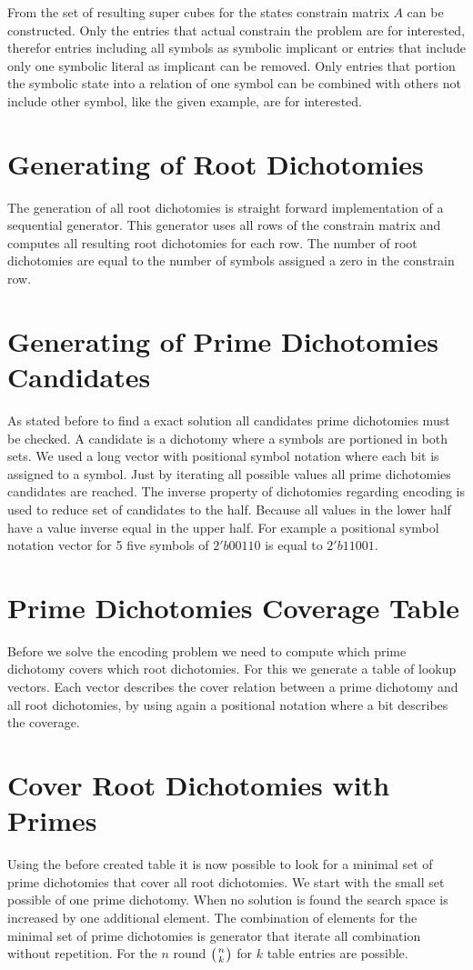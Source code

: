 From the set of resulting super cubes for the states constrain matrix $A$ can be constructed. Only the entries that actual constrain the problem are for interested, therefor entries including all symbols as symbolic implicant or entries that include only one symbolic literal as implicant can be removed. Only entries that portion the symbolic state into a relation of one symbol can be combined with others not include other symbol, like the given example, are for interested. 

\section{Generating of Root Dichotomies}
The generation of all root dichotomies is straight forward implementation of a sequential generator. This generator uses all rows of the constrain matrix and computes all resulting root dichotomies for each row. The number of root dichotomies are equal to the number of symbols assigned a zero in the constrain row.

\section{Generating of Prime Dichotomies Candidates}
As stated before to find a exact solution all candidates prime dichotomies must be checked. A candidate is a dichotomy where a symbols are portioned in both sets. We used a long vector with positional symbol notation where each bit is assigned to a symbol. Just by iterating all possible values all prime dichotomies candidates are reached. The inverse property of dichotomies regarding encoding is used to reduce set of candidates to the half. Because all values in the lower half have a value inverse equal in the upper half. For example a positional symbol notation vector for 5 five symbols of $2'b00110$ is equal to $2'b11001$.

\section{Prime Dichotomies Coverage Table}
Before we solve the encoding problem we need to compute which prime dichotomy covers which root dichotomies. For this we generate a table of lookup vectors. Each vector describes the cover relation between a prime dichotomy and all root dichotomies, by using again a positional notation where a bit describes the coverage.

\section{Cover Root Dichotomies with Primes}
Using the before created table it is now possible to look for a minimal set of prime dichotomies that cover all root dichotomies. We start with the small set possible of one prime dichotomy. When no solution is found the search space is increased by one additional element. The combination of elements for the minimal set of prime dichotomies is generator that iterate all combination without repetition. For the $n$ round $\left( n\atop k \right)$ for $k$ table entries are possible.